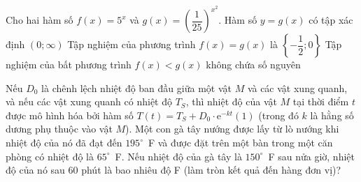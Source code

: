\begin{ex}%
	Cho hai hàm số $f(x)=5^x$ và $g(x)=\left(\dfrac{1}{25}\right)^{x^2}$.
	{Hàm số $y=g(x)$ có tập xác định $(0 ; \infty)$}
	{\True Tập nghiệm của phương trình $f(x)=g(x)$ là $\left\{-\dfrac{1}{2} ; 0\right\}$}
	{\True Tập nghiệm của bất phương trình $f(x)<g(x)$ không chứa số nguyên}
\end{ex}

\begin{ex}%
	Nếu $D_0$ là chênh lệch nhiệt độ ban đầu giữa một vật $M$ và các vật xung quanh, và nếu các vật xung quanh có nhiệt độ $T_S$, thì nhiệt độ của vật $M$ tại thời điểm $t$ được mô hình hóa bởi hàm số $T(t)=T_S+D_0 \cdot \mathrm{e}^{-kt} (1)$ (trong đó $k$ là hằng số dương phụ thuộc vào vật $M$). Một con gà tây nướng được lấy từ lò nướng khi nhiệt độ của nó đã đạt đến $195^\circ$~F và được đặt trên một bàn trong một căn phòng có nhiệt độ là $65^\circ$~F. Nếu nhiệt độ của gà tây là $150^\circ$~F sau nửa giờ, nhiệt độ của nó sau $60$ phút là bao nhiêu độ F (làm tròn kết quả đến hàng đơn vị)? 
\end{ex}


